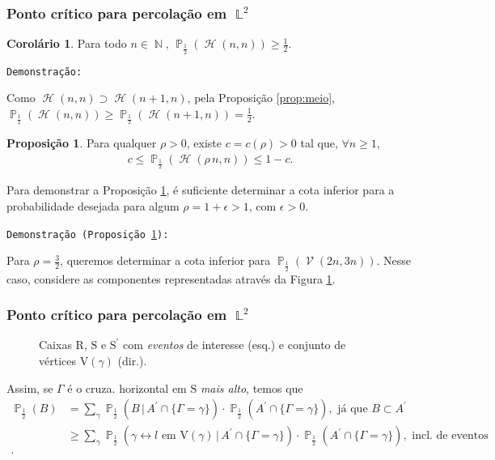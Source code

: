 \documentclass[9pt]{beamer}
\theoremstyle{definition} %
\newtheorem{mypro}{Proposição}
\newtheorem{mycol}{Corolário}
\DeclareMathOperator{\PX}{\mathbb{P}} %
\DeclareMathOperator{\NX}{\mathbb{N}} %
\DeclareMathOperator{\LX}{\mathbb{L}} %
\DeclareMathOperator{\HC}{\mathcal{H}} %
\DeclareMathOperator{\VC}{\mathcal{V}} %
\begin{document}
	\begin{frame}[t]
	\frametitle{Ponto crítico para percolação em $\LX^2$}
		\begin{mycol}\label{col:quadrado}
			Para todo $n \in \NX$, $\PX_{\frac{1}{2}}(\HC(n, n)) \geq \frac{1}{2}$.
		\end{mycol}\pause
		\vspace{-3pt}
		\texttt{Demonstração:}
		
		Como $\HC(n, n) \supset \HC(n+1, n)$, pela Proposição \ref{prop:meio}, $\PX_{\frac{1}{2}}(\HC(n, n)) \geq \PX_{\frac{1}{2}}(\HC(n+1, n)) = \frac{1}{2}$. \pause
		
		\begin{mypro} \label{prop:rho}
			Para qualquer $\rho > 0$, existe $c = c(\rho) > 0$ tal que, $\forall n \geq 1$,
			\begin{align*}
				c \leq \PX_{\frac{1}{2}}(\HC(\rho \, n, n)) \leq 1 - c.
			\end{align*}
		\end{mypro}
		\vspace{-3pt}
		Para demonstrar a Proposição \ref{prop:rho}, é suficiente determinar a cota inferior para a probabilidade desejada para algum $\rho = 1 + \epsilon > 1$, com $\epsilon > 0$. \pause
		
		\texttt{Demonstração (Proposição \ref{prop:rho}):}
		
		Para $\rho = \frac{3}{2}$, queremos determinar a cota inferior para $\PX_{\frac{1}{2}}(\VC(2n, 3n))$. Nesse caso, considere as componentes representadas através da Figura \ref{fig:fig-cruz}.
	\end{frame}

	\begin{frame}[t]
		\frametitle{Ponto crítico para percolação em $\LX^2$}
		\vspace{-9pt}
		\begin{figure}
		
		\vspace{-9pt}
		\caption{\justifying Caixas $\text{R}$, $\text{S}$ e $\text{S}^{\prime}$ com \textit{{\color{red}ev}{\color{blue}en}{\color{green}tos}} de interesse (esq.) e conjunto de vértices $\text{V}(\gamma)$ (dir.).}
		\label{fig:fig-cruz}
		\end{figure}\pause
		\vspace{-9pt}
	Assim, se $\Gamma$ é o cruza. horizontal em $\text{S}$ \textit{mais alto}, temos que
	\begin{align*}
	\PX_{\frac{1}{2}}(B) &= \sum_{\gamma}\PX_{\frac{1}{2}}(B\,|\,A^{\prime} \cap \{\Gamma = \gamma\}) \cdot \PX_{\frac{1}{2}}(A^{\prime} \cap \{\Gamma = \gamma\}), \text{ já que } B \subset A^{\prime} \\
	&\geq  \sum_{\gamma}\PX_{\frac{1}{2}}(\gamma \leftrightarrow l \text{ em } \text{V}(\gamma) \,|\, A^{\prime} \cap \{\Gamma = \gamma\}) \cdot \PX_{\frac{1}{2}}(A^{\prime} \cap \{\Gamma = \gamma\}), \text{ incl. de eventos} \\.
	\end{align*}  
	\end{frame}
\end{document}

